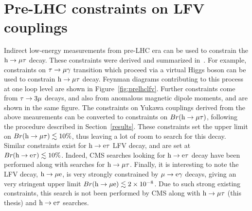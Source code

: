 \section{Pre-LHC constraints on LFV couplings}

Indirect low-energy measurements from pre-LHC era can be used to constrain the $\text{h} \to \mu \tau$ decay. These constraints were derived and summarized in~\cite{Harnik:2012pb}. For example, constraints on $\tau\rightarrow\mu\gamma$ transition which proceed via a virtual Higgs boson can be used to constrain $\text{h} \to \mu \tau$ decay. Feynman diagrams contributing to this process at one loop level are shown in Figure~\ref{fig:prelhclfv}. Further constraints come from $\tau\rightarrow 3\mu$ decays, and also from anomalous magnetic dipole moments, and are shown in the same figure. The constraints on Yukawa couplings derived from the above meaurements can be converted to constraints on $Br(\text{h} \to \mu \tau)$, following the procedure described in Section~\ref{results}. These constraints set the upper limit on $Br(\text{h} \to \mu \tau)\lesssim 10\%$, thus leaving a lot of room to search for this decay. Similar constraints exist for $\text{h} \to \text{e} \tau$ LFV decay, and are set at $Br(\text{h} \to \text{e} \tau)\lesssim 10\%$. Indeed, CMS searches looking for $\text{h} \to \text{e} \tau$ decay have been performed along with searches for $\text{h} \to \mu \tau$. Finally, it is interesting to note the LFV decay, $\text{h} \to \mu \text{e}$, is very strongly constrained by $\mu\rightarrow\text{e}\gamma$ decays, giving an very stringent upper limit $Br(\text{h} \to \mu \text{e})\lesssim 2\times10^{-8}$. Due to such strong existing constraints, this search is not been performed by CMS along with $\text{h} \to \mu \tau$ (this thesis) and $\text{h} \to \text{e} \tau$ searches.           

